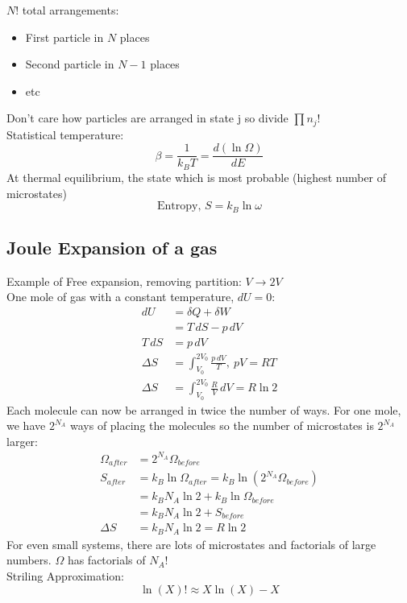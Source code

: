 \documentclass[a4paper, 11pt, normalem]{report}
\begin{document}
$N!$ total arrangements:
\begin{itemize}
    \item First particle in $N$ places
    \item Second particle in $N - 1$ places
    \item etc
\end{itemize}
Don't care how particles are arranged in state j so divide $\prod n_j!$ \\
Statistical temperature:
\begin{equation*}
    \beta = \frac{1}{k_B T} = \frac{d(\ln\Omega)}{dE}
\end{equation*}
At thermal equilibrium, the state which is most probable (highest number of microstates)
\begin{equation*}
    \text{Entropy, }S = k_B \ln\omega
\end{equation*}

\subsection{Joule Expansion of a gas}
Example of Free expansion, removing partition: $V \to 2V$ \\
One mole of gas with a constant temperature, $dU = 0$:
\begin{align*}
    dU &= \delta Q + \delta W \\
    &= T\,dS - p\,dV \\
    T\,dS &= p\,dV \\
    \Delta S &= \int_{V_0}^{2V_0} \frac{p\,dV}{T},~ pV = RT \\
    \Delta S &= \int_{V_0}^{2V_0} \frac{R}{V}\,dV = R\ln2
\end{align*}
Each molecule can now be arranged in twice the number of ways. For one mole, we have $2^{N_A}$ ways of placing the molecules so the number of microstates is $2^{N_A}$ larger:
\begin{align*}
    \Omega_{after} &= 2^{N_A}\Omega_{before} \\
    S_{after} &= k_B \ln\Omega_{after} = k_B \ln(2^{N_A}\Omega_{before}) \\
    &= k_B N_A \ln2 + k_B\ln\Omega_{before} \\
    &= k_B N_A \ln2 + S_{before} \\
    \Delta S &= k_B N_A \ln2 = R\ln2
\end{align*}
For even small systems, there are lots of microstates and factorials of large numbers. $\Omega$ has factorials of $N_A!$ \\
Striling Approximation:
\begin{equation*}
    \ln(X)! \approx X\ln(X) - X
\end{equation*}
\end{document}
